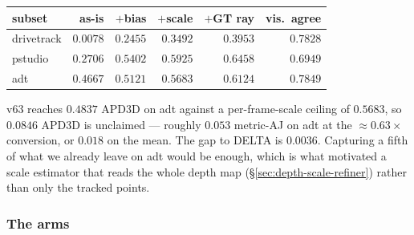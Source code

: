 \documentclass[11pt,a4paper]{article}
\begin{document}
\begin{center}\small
\begin{tabular}{lrrrrr}
\toprule
subset & as-is & $+$bias & $+$scale & $+$GT ray & vis.\ agree \\
\midrule
drivetrack & $0.0078$ & $0.2455$ & $0.3492$ & $0.3953$ & $0.7828$ \\
pstudio    & $0.2706$ & $0.5402$ & $0.5925$ & $0.6458$ & $0.6949$ \\
adt        & $0.4667$ & $0.5121$ & $0.5683$ & $0.6124$ & $0.7849$ \\
\bottomrule
\end{tabular}
\end{center}

v63 reaches $0.4837$ APD3D on adt against a per-frame-scale ceiling of $0.5683$, so $0.0846$ APD3D
is unclaimed --- roughly $0.053$ metric-AJ on adt at the $\approx 0.63\times$ conversion, or
$0.018$ on the mean. The gap to DELTA is $0.0036$. Capturing a fifth of what we already leave on
adt would be enough, which is what motivated a scale estimator that reads the whole depth map
(\S\ref{sec:depth-scale-refiner}) rather than only the tracked points.

\subsubsection{The arms}
\label{sec:dsr-arms}
\end{document}
